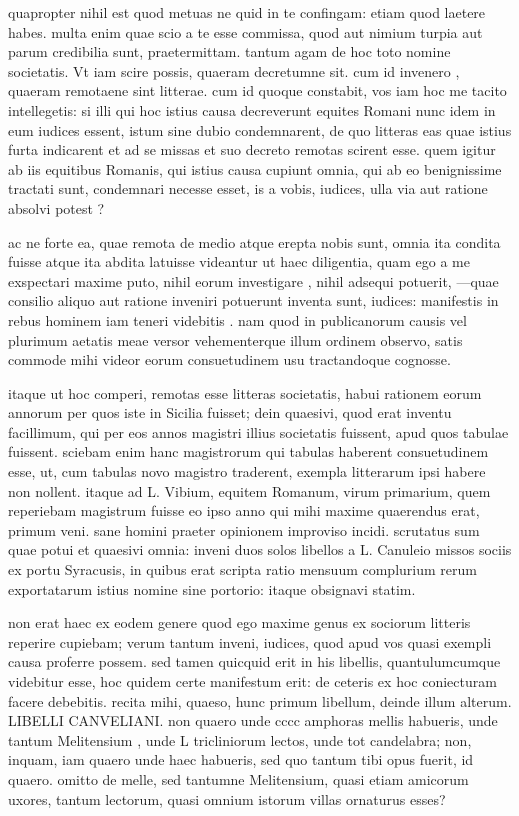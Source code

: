  quapropter nihil est quod metuas ne quid in te confingam: etiam quod laetere habes. multa enim quae scio a te esse commissa, quod aut nimium turpia aut parum credibilia sunt, praetermittam. tantum agam de hoc toto nomine societatis. Vt iam scire possis, quaeram decretumne sit. cum id invenero , quaeram remotaene sint litterae. cum id quoque constabit, vos iam hoc me tacito intellegetis: si illi qui hoc istius causa decreverunt equites Romani nunc idem in eum iudices essent, istum sine dubio condemnarent, de quo litteras eas quae istius furta indicarent et ad se missas et suo decreto remotas scirent esse. quem igitur ab iis equitibus Romanis, qui istius causa cupiunt omnia, qui ab eo benignissime tractati sunt, condemnari necesse esset, is a vobis, iudices, ulla via aut ratione absolvi potest ?

 ac ne forte ea, quae remota de medio atque erepta nobis sunt, omnia ita condita fuisse atque ita abdita latuisse videantur ut haec diligentia, quam ego a me exspectari maxime puto, nihil eorum investigare , nihil adsequi potuerit, —quae consilio aliquo aut ratione inveniri potuerunt inventa sunt, iudices: manifestis in rebus hominem iam teneri videbitis . nam quod in publicanorum causis vel plurimum aetatis meae versor vehementerque illum ordinem observo, satis commode mihi videor eorum consuetudinem usu tractandoque cognosse.

 itaque ut hoc comperi, remotas esse litteras societatis, habui rationem eorum annorum per quos iste in Sicilia fuisset; dein quaesivi, quod erat inventu facillimum, qui per eos annos magistri illius societatis fuissent, apud quos tabulae fuissent. sciebam enim hanc magistrorum qui tabulas haberent consuetudinem esse, ut, cum tabulas novo magistro traderent, exempla litterarum ipsi habere non nollent. itaque ad L. Vibium, equitem Romanum, virum primarium, quem reperiebam magistrum fuisse eo ipso anno qui mihi maxime quaerendus erat, primum veni. sane homini praeter opinionem improviso incidi. scrutatus sum quae potui et quaesivi omnia: inveni duos solos libellos a L. Canuleio missos sociis ex portu Syracusis, in quibus erat scripta ratio mensuum complurium rerum exportatarum istius nomine sine portorio: itaque obsignavi statim.

 non erat haec ex eodem genere quod ego maxime genus ex sociorum litteris reperire cupiebam; verum tantum inveni, iudices, quod apud vos quasi exempli causa proferre possem. sed tamen quicquid erit in his libellis, quantulumcumque videbitur esse, hoc quidem certe manifestum erit: de ceteris ex hoc coniecturam facere debebitis. recita mihi, quaeso, hunc primum libellum, deinde illum alterum. LIBELLI CANVELIANI. non quaero unde cccc amphoras mellis habueris, unde tantum Melitensium , unde L tricliniorum lectos, unde tot candelabra; non, inquam, iam quaero unde haec habueris, sed quo tantum tibi opus fuerit, id quaero. omitto de melle, sed tantumne Melitensium, quasi etiam amicorum uxores, tantum lectorum, quasi omnium istorum villas ornaturus esses?

